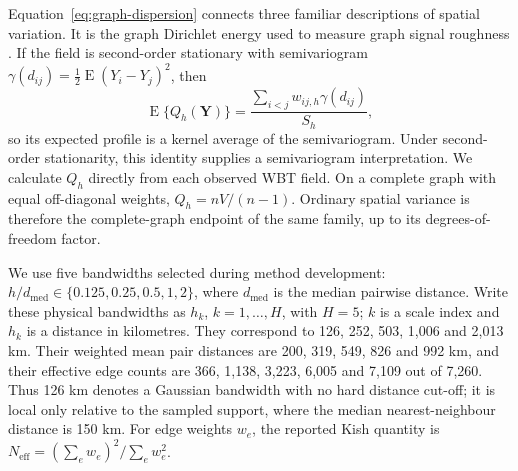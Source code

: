 \documentclass[namedate,webpdf,modern,mediumone]{oup-authoring-template}
\begin{document}
Equation~\eqref{eq:graph-dispersion} connects three familiar descriptions of
spatial variation. It is the graph Dirichlet energy used to measure graph
signal roughness \citep{shuman2013,dong2016}. If the field is second-order
stationary with semivariogram
$\gamma(d_{ij})=\tfrac12\operatorname{E}(Y_i-Y_j)^2$, then
\begin{equation}
  \operatorname{E}\{Q_h(\mathbf Y)\}
  =\frac{\sum_{i<j}w_{ij,h}\gamma(d_{ij})}{S_h},
  \label{eq:variogram-average}
\end{equation}
so its expected profile is a kernel average of the semivariogram. Under
second-order stationarity, this identity supplies a semivariogram
interpretation. We calculate $Q_h$ directly from each observed WBT field. On a complete graph with equal off-diagonal
weights, $Q_h=nV/(n-1)$. Ordinary spatial variance is therefore the
complete-graph endpoint of the same family, up to its degrees-of-freedom
factor.

We use five bandwidths selected during method development:
$h/d_{\mathrm{med}}\in\{0.125,0.25,0.5,1,2\}$, where
$d_{\mathrm{med}}$ is the median pairwise distance. Write these physical
bandwidths as $h_k$, $k=1,\ldots,H$, with $H=5$; $k$ is a scale index
and $h_k$ is a distance in kilometres.
They correspond to 126, 252, 503, 1,006 and 2,013 km. Their weighted mean pair
distances are 200, 319, 549, 826 and 992 km, and their effective edge counts
are 366, 1,138, 3,223, 6,005 and 7,109 out of 7,260. Thus 126 km denotes a
Gaussian bandwidth with no hard distance cut-off; it is local only relative to
the sampled support, where the median nearest-neighbour distance is 150 km.
For edge weights $w_e$, the reported Kish quantity is
$N_{\mathrm{eff}}=(\sum_e w_e)^2/\sum_e w_e^2$.
\end{document}

